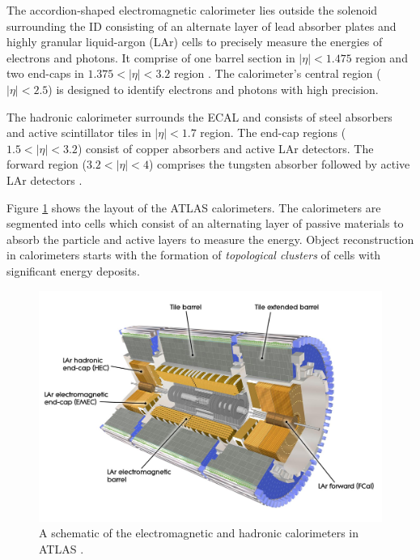 The accordion-shaped electromagnetic calorimeter lies outside the solenoid surrounding the ID consisting of an alternate layer of lead absorber plates and highly granular liquid-argon (LAr) cells to precisely measure the energies of electrons and photons. It comprise of one barrel section in $|\eta| < 1.475$ region and two end-caps in $1.375 < |\eta| < 3.2$ region \cite{ATLAS_ECAL}. The calorimeter's central region ($|\eta| < 2.5$) is designed to identify electrons and photons with high precision.

The hadronic calorimeter surrounds the ECAL and consists of steel absorbers and active scintillator tiles in $|\eta| < 1.7$ region. The end-cap regions ($1.5 < |\eta| < 3.2$) consist of copper absorbers and active LAr detectors. The forward region ($3.2 < |\eta| < 4$) comprises the tungsten absorber followed by active LAr detectors \cite{ATLAS_HCAL}. 

Figure \ref{fig:ATLAS_Cals} shows the layout of the ATLAS calorimeters. The calorimeters are segmented into cells which consist of an alternating layer of passive materials to absorb the particle and active layers to measure the energy. Object reconstruction in calorimeters starts with the formation of \textit{topological clusters} of cells with significant energy deposits.

\begin{figure}[!htb]
    \centering
    \includegraphics[width=.98\linewidth]{figures/LHC/ATLAS_CALO.jpeg}
    \caption{ A schematic of the electromagnetic and hadronic calorimeters in ATLAS \cite{ATLAS}.\label{fig:ATLAS_Cals}}
\end{figure}

